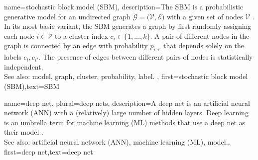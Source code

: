 {name={stochastic block model (SBM)},
	description={The SBM is a 
		probabilistic generative model for an undirected graph $\mathcal{G} = \big( \mathcal{V}, \mathcal{E} \big)$ 
		with a given set of nodes $\mathcal{V}$ \cite{AbbeSBM2018}. In its most basic variant, 
		the SBM generates a graph by first randomly assigning each node $i \in \mathcal{V}$ to 
		a cluster index $c_{i} \in \{1,\ldots,k\}$. A pair of different nodes in the 
		graph is connected by an edge with probability $p_{i,i'}$ that depends 
		solely on the labels $c_{i}, c_{i'}$. 
		The presence of edges between different pairs of 
		nodes is statistically independent.
					\\ 
		See also: model, graph, cluster, probability, label. },
	first={stochastic block model (SBM)},text={SBM} 
}

{name={deep net}, plural={deep nets},
	description={A deep net is an artificial neural network (ANN) with a (relatively) large number of 
	hidden layers. Deep learning is an umbrella term for machine learning (ML) methods that use a deep 
	net as their model \cite{Goodfellow-et-al-2016}.
				\\ 
		See also: artificial neural network (ANN), machine learning (ML), model.},
	first={deep net},text={deep net} 
}

\newcommand{\gaussiancenter}{3}

